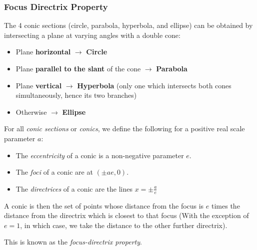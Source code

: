 \documentclass[../main.tex]{subfiles}
\begin{document}
\subsubsection{Focus Directrix Property}
The 4 conic sections (circle, parabola, hyperbola, and ellipse) can be obtained by intersecting a plane at varying angles with a double cone:
\begin{itemize}
  \item Plane \textbf{horizontal} $\to$ \textbf{Circle}
  \item Plane \textbf{parallel to the slant} of the cone $\to$ \textbf{Parabola}
  \item Plane \textbf{vertical} $\to$ \textbf{Hyperbola} (only one which intersects both cones simultaneously, hence its two branches)
  \item Otherwise $\to$ \textbf{Ellipse}
\end{itemize}
\begin{definition}
  For all \textit{conic sections} or \textit{conics}, we define the following for a positive real scale parameter $a$:
  \begin{itemize}
    \item The \textit{eccentricity} of a conic is a non-negative parameter $e$.
    \item The \textit{foci} of a conic are at $(\pm ae, 0)$.
    \item The \textit{directrices} of a conic are the lines $x = \pm \frac{a}{e}$
  \end{itemize}
  A conic is then the set of points whose distance from the focus is $e$ times the distance from the directrix which is closest to that focus (With the exception of $e = 1$, in which case, we take the distance to the other further directrix).

  This is known as the \textit{focus-directrix property}.
\end{definition}
\end{document}

